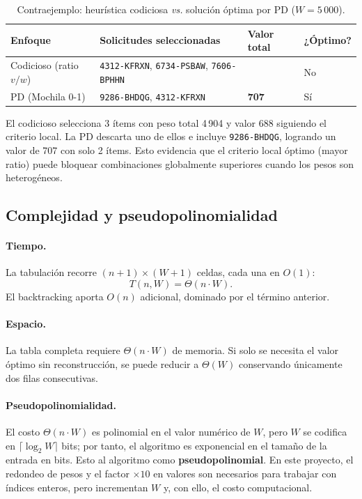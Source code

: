 \documentclass[12pt, a4paper]{article}
\begin{document}
\begin{table}[h!]
\centering
\small
\begin{tabularx}{\textwidth}{
  >{\raggedright\arraybackslash}p{4cm}
  >{\raggedright\arraybackslash}X
  >{\centering\arraybackslash}p{2cm}
  >{\centering\arraybackslash}p{1.8cm}
}
\toprule
\textbf{Enfoque} & \textbf{Solicitudes seleccionadas} & \textbf{Valor total} & \textbf{¿Óptimo?} \\
\midrule
Codicioso (ratio $v/w$) & \texttt{4312-KFRXN}, \texttt{6734-PSBAW}, \texttt{7606-BPHHN} & 688 & No \\
PD (Mochila 0-1) & \texttt{9286-BHDQG}, \texttt{4312-KFRXN} & \textbf{707} & Sí \\
\bottomrule
\end{tabularx}
\caption{Contraejemplo: heurística codiciosa \textit{vs.} solución óptima por PD ($W = 5\,000$).}
\end{table}

El codicioso selecciona 3 ítems con peso total 4\,904 y valor 688 siguiendo el criterio local. La PD descarta uno de ellos e incluye \texttt{9286-BHDQG}, logrando un valor de 707 con solo 2 ítems. Esto evidencia que el criterio local óptimo (mayor ratio) puede bloquear combinaciones globalmente superiores cuando los pesos son heterogéneos.

\subsection{Complejidad y pseudopolinomialidad}

\paragraph{Tiempo.} La tabulación recorre $(n+1) \times (W+1)$ celdas, cada una en $O(1)$:
\[
  T(n, W) = \Theta(n \cdot W).
\]
El backtracking aporta $O(n)$ adicional, dominado por el término anterior.

\paragraph{Espacio.} La tabla completa requiere $\Theta(n \cdot W)$ de memoria. Si solo se necesita el valor óptimo sin reconstrucción, se puede reducir a $\Theta(W)$ conservando únicamente dos filas consecutivas.

\paragraph{Pseudopolinomialidad.} El costo $\Theta(n \cdot W)$ es polinomial en el valor numérico de $W$, pero $W$ se codifica en $\lceil \log_2 W \rceil$ bits; por tanto, el algoritmo es exponencial en el tamaño de la entrada en bits. Esto al algoritmo como \textbf{pseudopolinomial}. En este proyecto, el redondeo de pesos y el factor $\times 10$ en valores son necesarios para trabajar con índices enteros, pero incrementan $W$ y, con ello, el costo computacional.
\end{document}
